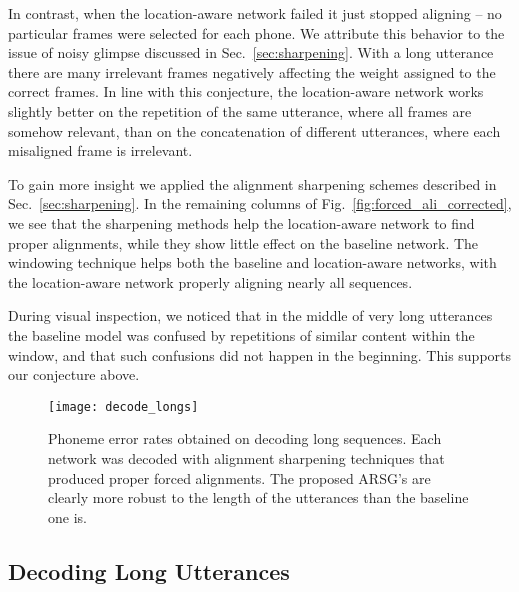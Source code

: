 \documentclass{article}
\begin{document}
In contrast, when the location-aware network failed it just stopped aligning --
no particular frames were selected for each phone.  We attribute this behavior
to the issue of noisy glimpse discussed in Sec.~\ref{sec:sharpening}. With a
long utterance there are many 
irrelevant frames negatively affecting the weight assigned to the correct
frames. In line with this conjecture, the location-aware network works slightly
better on the repetition of the same utterance, where all frames are somehow
relevant, than on the concatenation of different utterances, where each
misaligned frame is irrelevant. 

To gain more insight 
we applied the alignment sharpening schemes described in
Sec.~\ref{sec:sharpening}. In the remaining columns of
Fig.~\ref{fig:forced_ali_corrected}, we see that the sharpening
methods help the location-aware network to find proper alignments, while they
show little effect on the baseline network. 
The windowing technique helps both the baseline and location-aware networks,
with the location-aware network properly aligning nearly all sequences. 

During visual inspection, we noticed that in the middle of very long utterances
the baseline model was confused by repetitions of similar content within the
window, and that such confusions did not happen in the beginning. This supports
our conjecture above.



\begin{figure}[t]
  \centering
  \texttt{[image: decode\_longs]}
\caption[Phoneme error rates obtained on decoding long sequences.]{ 
      Phoneme error rates obtained on decoding long sequences. Each network was
      decoded with alignment sharpening techniques that produced proper forced
      alignments. The proposed ARSG's are clearly more robust to the length of
      the utterances than the baseline one is.
  }
  \label{fig:decoding_longs}

  \vspace{-4mm}
\end{figure}

\subsection{Decoding Long Utterances}
\end{document}
